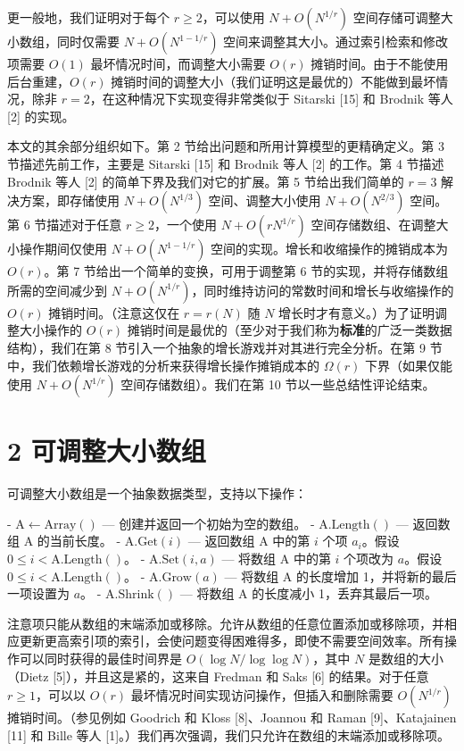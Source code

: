 \documentclass[12pt,a4paper]{ctexart}
\theoremstyle{remark}
\begin{document}
更一般地，我们证明对于每个 $r\geq 2$，可以使用 $N+O(N^{1/r})$ 空间存储可调整大小数组，同时仅需要 $N+O(N^{1-1/r})$ 空间来调整其大小。通过索引检索和修改项需要 $O(1)$ 最坏情况时间，而调整大小需要 $O(r)$ 摊销时间。由于不能使用后台重建，$O(r)$ 摊销时间的调整大小（我们证明这是最优的）不能做到最坏情况，除非 $r=2$，在这种情况下实现变得非常类似于 Sitarski [15] 和 Brodnik 等人 [2] 的实现。

本文的其余部分组织如下。第 2 节给出问题和所用计算模型的更精确定义。第 3 节描述先前工作，主要是 Sitarski [15] 和 Brodnik 等人 [2] 的工作。第 4 节描述 Brodnik 等人 [2] 的简单下界及我们对它的扩展。第 5 节给出我们简单的 $r=3$ 解决方案，即存储使用 $N+O(N^{1/3})$ 空间、调整大小使用 $N+O(N^{2/3})$ 空间。第 6 节描述对于任意 $r\geq 2$，一个使用 $N+O(rN^{1/r})$ 空间存储数组、在调整大小操作期间仅使用 $N+O(N^{1-1/r})$ 空间的实现。增长和收缩操作的摊销成本为 $O(r)$。第 7 节给出一个简单的变换，可用于调整第 6 节的实现，并将存储数组所需的空间减少到 $N+O(N^{1/r})$，同时维持访问的常数时间和增长与收缩操作的 $O(r)$ 摊销时间。（注意这仅在 $r=r(N)$ 随 $N$ 增长时才有意义。）为了证明调整大小操作的 $O(r)$ 摊销时间是最优的（至少对于我们称为\textbf{标准}的广泛一类数据结构），我们在第 8 节引入一个抽象的增长游戏并对其进行完全分析。在第 9 节中，我们依赖增长游戏的分析来获得增长操作摊销成本的 $\Omega(r)$ 下界（如果仅能使用 $N+O(N^{1/r})$ 空间存储数组）。我们在第 10 节以一些总结性评论结束。

\section{2 可调整大小数组}

可调整大小数组是一个抽象数据类型，支持以下操作：

- $\text{A}\leftarrow\text{Array}()$ — 创建并返回一个初始为空的数组。
- $\text{A.Length}()$ — 返回数组 A 的当前长度。
- $\text{A.Get}(i)$ — 返回数组 A 中的第 $i$ 个项 $a_i$。假设 $0\leq i<\text{A.Length}()$。
- $\text{A.Set}(i,a)$ — 将数组 A 中的第 $i$ 个项改为 $a$。假设 $0\leq i<\text{A.Length}()$。
- $\text{A.Grow}(a)$ — 将数组 A 的长度增加 1，并将新的最后一项设置为 $a$。
- $\text{A.Shrink}()$ — 将数组 A 的长度减小 1，丢弃其最后一项。

注意项只能从数组的末端添加或移除。允许从数组的任意位置添加或移除项，并相应更新更高索引项的索引，会使问题变得困难得多，即使不需要空间效率。所有操作可以同时获得的最佳时间界是 $O(\log N/\log\log N)$，其中 $N$ 是数组的大小（Dietz [5]），并且这是紧的，这来自 Fredman 和 Saks [6] 的结果。对于任意 $r\geq 1$，可以以 $O(r)$ 最坏情况时间实现访问操作，但插入和删除需要 $O(N^{1/r})$ 摊销时间。（参见例如 Goodrich 和 Kloss [8]、Joannou 和 Raman [9]、Katajainen [11] 和 Bille 等人 [1]。）我们再次强调，我们只允许在数组的末端添加或移除项。
\end{document}
